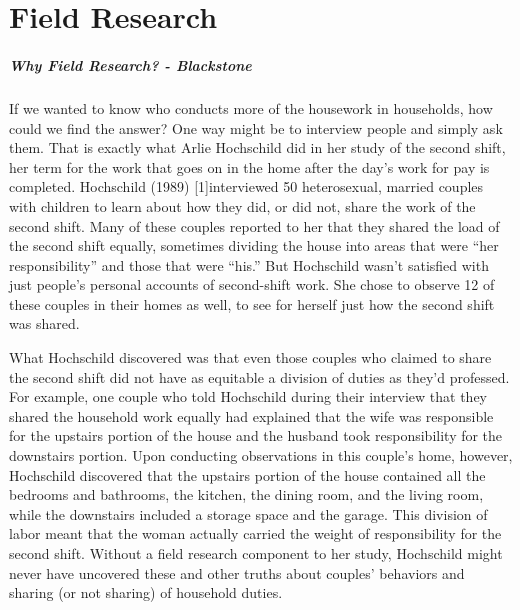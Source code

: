 \chapter{Field Research}\label{ch13:field_research}

\paragraph{Why Field Research? - Blackstone}

If we wanted to know who conducts more of the housework in households, how could we find the answer? One way might be to interview people and simply ask them. That is exactly what Arlie Hochschild did in her study of the second shift, her term for the work that goes on in the home after the day’s work for pay is completed. Hochschild (1989) [1]interviewed 50 heterosexual, married couples with children to learn about how they did, or did not, share the work of the second shift. Many of these couples reported to her that they shared the load of the second shift equally, sometimes dividing the house into areas that were “her responsibility” and those that were “his.” But Hochschild wasn’t satisfied with just people’s personal accounts of second-shift work. She chose to observe 12 of these couples in their homes as well, to see for herself just how the second shift was shared.

What Hochschild discovered was that even those couples who claimed to share the second shift did not have as equitable a division of duties as they’d professed. For example, one couple who told Hochschild during their interview that they shared the household work equally had explained that the wife was responsible for the upstairs portion of the house and the husband took responsibility for the downstairs portion. Upon conducting observations in this couple’s home, however, Hochschild discovered that the upstairs portion of the house contained all the bedrooms and bathrooms, the kitchen, the dining room, and the living room, while the downstairs included a storage space and the garage. This division of labor meant that the woman actually carried the weight of responsibility for the second shift. Without a field research component to her study, Hochschild might never have uncovered these and other truths about couples’ behaviors and sharing (or not sharing) of household duties.

